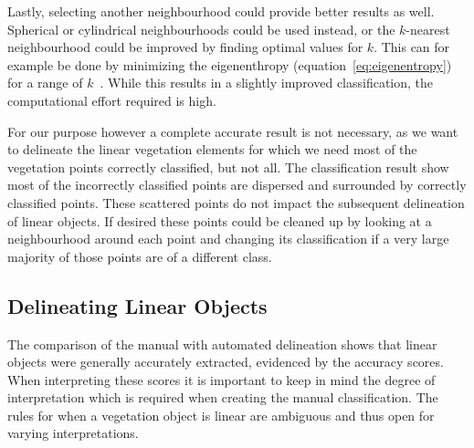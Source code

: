 Lastly, selecting another neighbourhood could provide better results as well. Spherical or cylindrical neighbourhoods could be used instead, or the \(k\)-nearest neighbourhood could be improved by finding optimal values for \(k\). This can for example be done by minimizing the eigenenthropy (equation~\ref{eq:eigenentropy}) for a range of \(k\)~\citep{weinmann2014semantic}. While this results in a slightly improved classification, the computational effort required is high.

For our purpose however a complete accurate result is not necessary, as we want to delineate the linear vegetation elements for which we need most of the vegetation points correctly classified, but not all. The classification result show most of the incorrectly classified points are dispersed and surrounded by correctly classified points. These scattered points do not impact the subsequent delineation of linear objects. If desired these points could be cleaned up by looking at a neighbourhood around each point and changing its classification if a very large majority of those points are of a different class.

\subsection{Delineating Linear Objects}
The comparison of the manual with automated delineation shows that linear objects were generally accurately extracted, evidenced by the accuracy scores. When interpreting these scores it is important to keep in mind the degree of interpretation which is required when creating the manual classification. The rules for when a vegetation object is linear are ambiguous and thus open for varying interpretations. 


